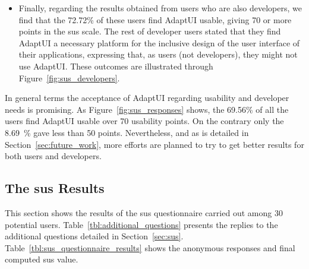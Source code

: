 \begin{itemize}
  \item Finally, regarding the results obtained from users who are also 
  developers, we find that the 72.72\% of these users find AdaptUI usable, 
  giving 70 or more points in the \ac{sus} scale. The rest of developer users 
  stated that they find AdaptUI a necessary platform for the inclusive design of 
  the user interface of their applications, expressing that, as users (not 
  developers), they might not use AdaptUI. These outcomes are illustrated
  through Figure~\ref{fig:sus_developers}.
\end{itemize}

In general terms the acceptance of AdaptUI regarding usability and developer
needs is promising. As Figure~\ref{fig:sus_responses} shows, the 69.56\% of all 
the users find AdaptUI usable over 70 usability points. On the contrary only
the 8.69~\% gave less than 50 points. Nevertheless, and as is detailed in 
Section~\ref{sec:future_work}, more efforts are planned to try to get better
results for both users and developers.

\subsection{The \ac{sus} Results}
\label{sec:sus_results}
 
This section shows the results of the \ac{sus} questionnaire carried out among
30 potential users. Table~\ref{tbl:additional_questions} presents the replies 
to the additional questions detailed in Section~\ref{sec:sus}.
Table~\ref{tbl:sus_questionnaire_results} shows the anonymous responses and final
computed \ac{sus} value.

